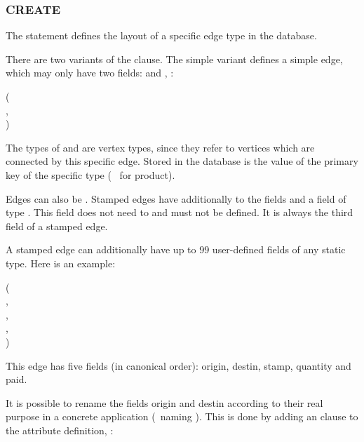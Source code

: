 \subsubsection{CREATE}
The  statement defines the layout
of a specific edge type in the database.

There are two variants of the  clause.
The simple variant defines a simple edge, which may only
have two fields:  and , \eg:

  ( \\
\hspace*{1cm} , \\
\hspace*{1cm} )

The types of  and 
are vertex types, since they refer
to vertices which are connected by this specific edge.
Stored in the database is the value of the primary key
of the specific type (\eg\  for product).

Edges can also be .
Stamped edges have additionally to the fields
 and 
a field  of type .
This field does not need to and must not be defined.
It is always the third field of a stamped edge.

A stamped edge can additionally have up to 99
user-defined fields of any static type.
Here is an example:

  ( \\
\hspace*{1cm}  , \\
\hspace*{1cm}  , \\
\hspace*{1cm}  , \\
\hspace*{1cm}  )

This edge has five fields (in canonical order):
origin, destin, stamp, quantity and paid. 

It is possible to rename the fields origin and destin
according to their real purpose in a concrete
application (\eg\ naming  ).
This is done by adding an  clause
to the attribute definition, \eg:

